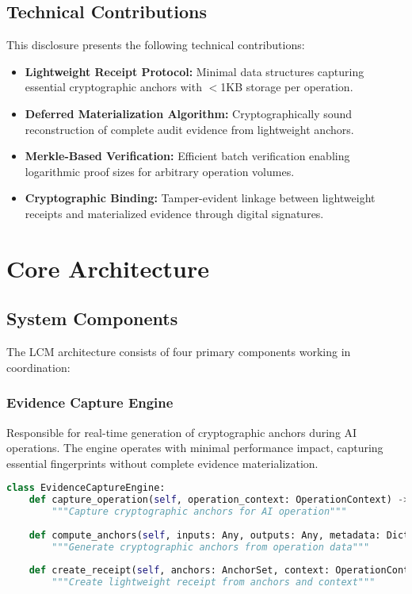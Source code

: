 \documentclass[12pt,a4paper]{article}
\begin{document}
\subsection{Technical Contributions}

This disclosure presents the following technical contributions:

\begin{itemize}
\item \textbf{Lightweight Receipt Protocol:} Minimal data structures capturing essential cryptographic anchors with $<$1KB storage per operation.

\item \textbf{Deferred Materialization Algorithm:} Cryptographically sound reconstruction of complete audit evidence from lightweight anchors.

\item \textbf{Merkle-Based Verification:} Efficient batch verification enabling logarithmic proof sizes for arbitrary operation volumes.

\item \textbf{Cryptographic Binding:} Tamper-evident linkage between lightweight receipts and materialized evidence through digital signatures.
\end{itemize}

\section{Core Architecture}

\subsection{System Components}

The LCM architecture consists of four primary components working in coordination:

\subsubsection{Evidence Capture Engine}

Responsible for real-time generation of cryptographic anchors during AI operations. The engine operates with minimal performance impact, capturing essential fingerprints without complete evidence materialization.

\begin{lstlisting}[language=Python, caption=Evidence Capture Engine Interface]
class EvidenceCaptureEngine:
    def capture_operation(self, operation_context: OperationContext) -> LightweightReceipt:
        """Capture cryptographic anchors for AI operation"""
        
    def compute_anchors(self, inputs: Any, outputs: Any, metadata: Dict) -> AnchorSet:
        """Generate cryptographic anchors from operation data"""
        
    def create_receipt(self, anchors: AnchorSet, context: OperationContext) -> LightweightReceipt:
        """Create lightweight receipt from anchors and context"""
\end{lstlisting}
\end{document}
